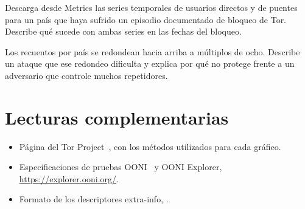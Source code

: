 \begin{esercizio}[2]\label{es:24-censura}
Descarga desde Metrics las series temporales de usuarios directos y de puentes para un país que haya sufrido un episodio documentado de bloqueo de Tor. Describe qué sucede con ambas series en las fechas del bloqueo.
\end{esercizio}

\begin{esercizio}[3]\label{es:24-privacy}
Los recuentos por país se redondean hacia arriba a múltiplos de ocho. Describe un ataque que ese redondeo dificulta y explica por qué no protege frente a un adversario que controle muchos repetidores.
\end{esercizio}

\section*{Lecturas complementarias}
\begin{itemize}
  \item Página  del Tor Project~\cite{metricsreproducible}, con los métodos utilizados para cada gráfico.
  \item Especificaciones de pruebas OONI~\cite{oonitor} y OONI Explorer, \url{https://explorer.ooni.org/}.
  \item Formato de los descriptores extra-info, .
\end{itemize}
